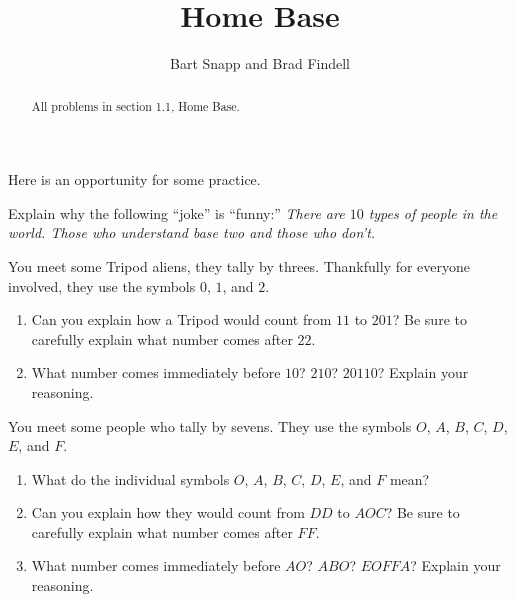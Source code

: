 \documentclass[nooutcomes]{ximera}
\title{Home Base}
\author{Bart Snapp and Brad Findell}
\begin{document}
\begin{abstract}
All problems in section 1.1, Home Base. 
\end{abstract}
\maketitle

%
%
%

Here is an opportunity for some practice. 

%
%


\begin{problem}Explain why the following ``joke'' is ``funny:'' \textit{There
  are $10$ types of people in the world. Those who understand base two
  and those who don't.}
\end{problem} 

\begin{problem}You meet some Tripod aliens, they tally by threes. Thankfully
  for everyone involved, they use the symbols $0$, $1$, and $2$. 
\begin{enumerate}
\item Can you explain how a Tripod would count from $11$ to $201$? Be
  sure to carefully explain what number comes after $22$.
\item What number comes immediately before $10$?  $210$? $20110$?
  Explain your reasoning.
\end{enumerate}
\end{problem} 

\begin{problem}You meet some people who tally by sevens. They use the symbols
  $O$, $A$, $B$, $C$, $D$, $E$, and $F$. 
\begin{enumerate}
\item What do the individual symbols $O$, $A$, $B$, $C$, $D$, $E$, and
  $F$ mean?
\item Can you explain how they would count from $DD$ to $AOC$? Be sure
  to carefully explain what number comes after $FF$.
\item What number comes immediately before $AO$?  $ABO$? $EOFFA$?
  Explain your reasoning.
\end{enumerate}
\end{problem} 
\end{document}
